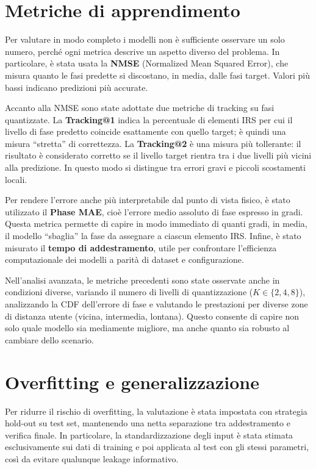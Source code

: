 \documentclass[12pt,a4paper]{report}
\begin{document}
\section{Metriche di apprendimento}
Per valutare in modo completo i modelli non è sufficiente osservare
un solo numero, perché ogni metrica descrive un aspetto diverso del
problema. In particolare, è stata usata la \textbf{NMSE} (Normalized
Mean Squared Error), che misura quanto le fasi predette si
discostano, in media, dalle fasi target. Valori più bassi indicano
predizioni più accurate.

Accanto alla NMSE sono state adottate due metriche di tracking su
fasi quantizzate. La \textbf{Tracking@1} indica la percentuale di
elementi IRS per cui il livello di fase predetto coincide esattamente
con quello target; è quindi una misura ``stretta'' di correttezza. La
\textbf{Tracking@2} è una misura più tollerante: il risultato è
considerato corretto se il livello target rientra tra i due livelli
più vicini alla predizione. In questo modo si distingue tra errori
gravi e piccoli scostamenti locali.

Per rendere l'errore anche più interpretabile dal punto di vista
fisico, è stato utilizzato il \textbf{Phase MAE}, cioè l'errore medio
assoluto di fase espresso in gradi. Questa metrica permette di capire
in modo immediato di quanti gradi, in media, il modello ``sbaglia''
la fase da assegnare a ciascun elemento IRS. Infine, è stato misurato
il \textbf{tempo di addestramento}, utile per confrontare
l'efficienza computazionale dei modelli a parità di dataset e configurazione.

Nell'analisi avanzata, le metriche precedenti sono state osservate
anche in condizioni diverse, variando il numero di livelli di
quantizzazione ($K\in\{2,4,8\}$), analizzando la CDF dell'errore di
fase e valutando le prestazioni per diverse zone di distanza utente
(vicina, intermedia, lontana). Questo consente di capire non solo
quale modello sia mediamente migliore, ma anche quanto sia robusto al
cambiare dello scenario.

\section{Overfitting e generalizzazione}
Per ridurre il rischio di overfitting, la valutazione è stata
impostata con strategia hold-out su test set, mantenendo una netta
separazione tra addestramento e verifica finale. In particolare, la
standardizzazione degli input è stata stimata esclusivamente sui dati
di training e poi applicata al test con gli stessi parametri, così da
evitare qualunque leakage informativo.
\end{document}
